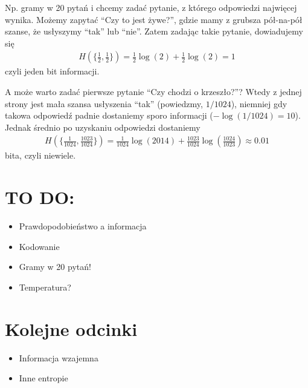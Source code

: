 \documentclass[10pt,a4paper]{article}
\begin{document}
Np. gramy w 20 pytań i chcemy zadać pytanie, z którego odpowiedzi najwięcej wynika. Możemy zapytać ``Czy to jest żywe?'', gdzie mamy z grubsza pół-na-pół szanse, że usłyszymy ``tak'' lub ``nie''.  Zatem zadając takie pytanie, dowiadujemy się
\begin{align}
H(\{ \tfrac{1}{2},\tfrac{1}{2}\}) = \tfrac{1}{2} \log(2) + \tfrac{1}{2} \log(2)  = 1
\end{align}
czyli jeden bit informacji. 

A może warto zadać pierwsze pytanie ``Czy chodzi o krzeszło?''? Wtedy z jednej strony jest mała szansa usłyszenia ``tak'' (powiedzmy, $1/1024$), niemniej gdy takowa odpowiedź padnie dostaniemy sporo informacji  ($-\log(1/1024)=10$). Jednak średnio po uzyskaniu odpowiedzi dostaniemy
\begin{align}
    H(\{ \tfrac{1}{1024},\tfrac{1023}{1024}\}) = \tfrac{1}{1024} \log(2014) + \tfrac{1023}{1024} \log(\tfrac{1024}{1023}) \approx 0.01
\end{align}
bita, czyli niewiele.


\section{TO DO:}

\begin{itemize}
    \item Prawdopodobieństwo a informacja
    \item Kodowanie
    \item Gramy w 20 pytań!
    \item Temperatura?
\end{itemize}

\section{Kolejne odcinki}

\begin{itemize}
    \item Informacja wzajemna
    \item Inne entropie
\end{itemize}


\end{document}
